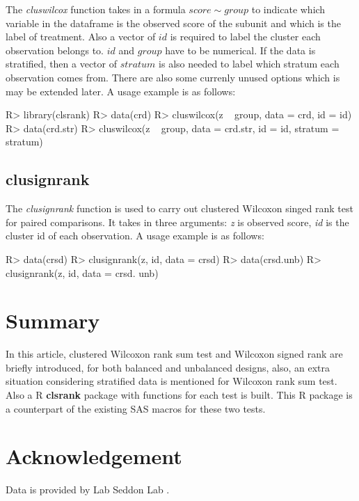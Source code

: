 \documentclass[article]{jss}
\begin{document}
The \emph{cluswilcox} function takes in a formula \(score \sim group\)
to indicate which variable in the dataframe is the observed score of the
subunit and which is the label of treatment. Also a vector of \(id\) is
required to label the cluster each observation belongs to. \(id\) and
\(group\) have to be numerical. If the data is stratified, then a vector
of \(stratum\) is also needed to label which stratum each observation
comes from. There are also some currenly unused options which is may be
extended later. A usage example is as follows:

\begin{CodeChunk} 
\begin{CodeInput}
R> library(clsrank)
R> data(crd)
R> cluswilcox(z ~ group, data = crd, id = id)
R> data(crd.str)
R> cluswilcox(z ~ group, data = crd.str, id = id, stratum = stratum)
\end{CodeInput}
\end{CodeChunk}

\subsection{clusignrank}\label{clusignrank}

The \emph{clusignrank} function is used to carry out clustered Wilcoxon
singed rank test for paired comparisons. It takes in three arguments:
\emph{z} is observed score, \emph{id} is the cluster id of each
observation. A usage example is as follows:

\begin{CodeChunk} 
\begin{CodeInput}
R> data(crsd)
R> clusignrank(z, id, data = crsd)
R> data(crsd.unb)
R> clusignrank(z, id, data = crsd. unb)
\end{CodeInput}
\end{CodeChunk}



\section{Summary}
In this article, clustered Wilcoxon rank sum test and Wilcoxon signed rank are briefly introduced, for both balanced and unbalanced designs, also, an extra situation considering stratified data is mentioned for Wilcoxon rank sum test. Also a R \textbf{clsrank} package with functions for each test is built. This R package is a counterpart of the existing SAS macros for these two tests. 

\section*{Acknowledgement}
Data  is provided by Lab Seddon Lab \citep{ferrara2015pheno}.%



\end{document}
